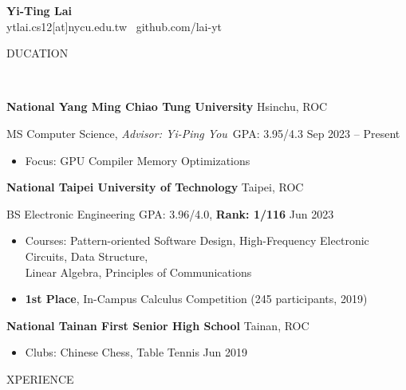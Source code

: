 \documentclass[11pt]{article}
\begin{document}
\begin{center}
    \textbf{\Large Yi-Ting Lai}\\
    ytlai.cs12[at]nycu.edu.tw \textbullet \ github.com/lai-yt
\end{center}

\vspace{0.5pt}

\begin{center}
    \scalebox{1.3}{E}DUCATION\raggedright \,\hrulefill
\end{center}

\textbf{National Yang Ming Chiao Tung University} \hfill Hsinchu, ROC

MS Computer Science, \textit{Advisor: Yi-Ping You} \,\qquad GPA: 3.95/4.3 \hfill Sep 2023 – Present

\begin{itemize}[noitemsep, topsep=0pt, partopsep=0pt, parsep=0pt, leftmargin=*]
    \item Focus: GPU Compiler Memory Optimizations
\end{itemize}

\vspace{6pt}

\textbf{National Taipei University of Technology} \hfill Taipei, ROC

BS Electronic Engineering \enskip \qquad \qquad \qquad \qquad \qquad GPA: 3.96/4.0, \textbf{Rank: 1/116} \hfill Jun 2023
\begin{itemize}[noitemsep, topsep=0pt, partopsep=0pt, parsep=0pt, leftmargin=*]
    \item Courses: Pattern-oriented Software Design, High-Frequency Electronic Circuits, Data Structure,\\Linear Algebra, Principles of Communications
    \item \textbf{1st Place}, In-Campus Calculus Competition (245 participants, 2019)
\end{itemize}

\vspace{6pt}

\textbf{National Tainan First Senior High School} \hfill    Tainan, ROC

\begin{itemize}[noitemsep, topsep=0pt, partopsep=0pt, parsep=0pt, leftmargin=*]
    \item Clubs: Chinese Chess, Table Tennis \hfill Jun 2019
\end{itemize}

\begin{center}
    \scalebox{1.3}{E}XPERIENCE\raggedright \,\hrulefill
\end{center}
\end{document}
